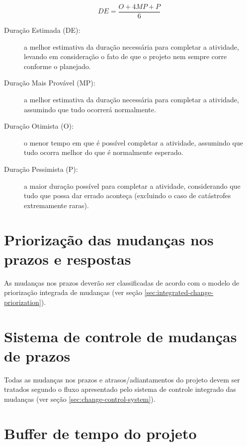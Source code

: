 \begin{itemize}
	      \begin{equation}\label{eq:pert}
		      DE = \frac{O+4MP+P}{6}
	      \end{equation}

	      \begin{description}
		      \item[Duração Estimada (DE):] a melhor estimativa da duração necessária para completar a atividade, levando em consideração o fato de que o projeto nem sempre corre conforme o planejado.
		      \item[Duração Mais Provável (MP):] a melhor estimativa da duração necessária para completar a atividade, assumindo que tudo ocorrerá normalmente.
		      \item[Duração Otimista (O):] o menor tempo em que é possível completar a atividade, assumindo que tudo ocorra melhor do que é normalmente esperado.
		      \item[Duração Pessimista (P):] a maior duração possível para completar a atividade, considerando que tudo que possa dar errado aconteça (excluindo o caso de catástrofes extremamente raras).
	      \end{description}
		  
\end{itemize}

\section{Priorização das mudanças nos prazos e respostas}

As mudanças nos prazos deverão ser classificadas de acordo com o modelo de priorização integrada de mudanças (ver seção \ref{sec:integrated-change-priorization}).

\section{Sistema de controle de mudanças de prazos}

Todas as mudanças nos prazos e atrasos/adiantamentos do projeto devem ser tratados segundo o fluxo apresentado pelo sistema de controle integrado das mudanças (ver seção \ref{sec:change-control-system}).


\section{Buffer de tempo do projeto}

